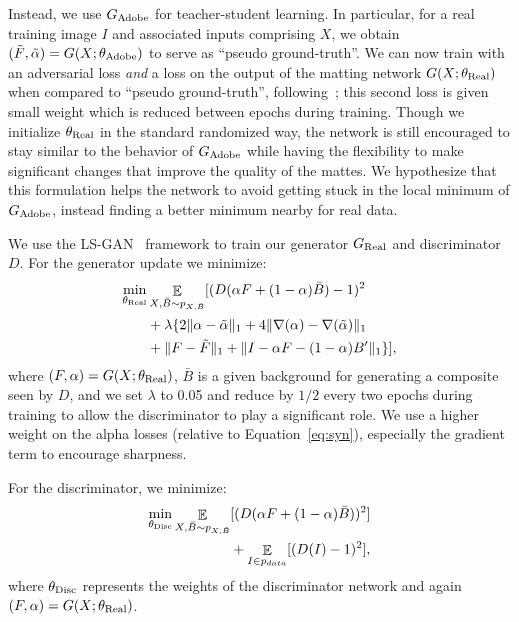 \documentclass[10pt,twocolumn,letterpaper]{article}
\DeclareMathOperator{\E}{\mathbb{E}}
\begin{document}
Instead, we use $G_{\rm Adobe}$ for teacher-student learning. In particular, for a real training image $I$ and associated inputs comprising $X$, we obtain $(\tilde{F}, \tilde{\alpha}) = G(X;\theta_{\rm Adobe})$ to serve as ``pseudo ground-truth''. We can now train with an adversarial loss {\it and} a loss on the output of the matting network $G(X;\theta_{\rm Real})$ when compared to ``pseudo ground-truth'', following~\cite{sfsnetSengupta18}; this second loss is given small weight which is reduced between epochs during training.  Though we initialize $\theta_{\rm Real}$ in the standard randomized way, the network is still encouraged to stay similar to the behavior of $G_{\rm Adobe}$ while having the flexibility to make significant changes that improve the quality of the mattes. We hypothesize that this formulation helps the network to avoid getting stuck in the local minimum of $G_{\rm Adobe}$, instead finding a better minimum nearby for real data. 

We use the LS-GAN~\cite{mao2017least} framework to train our generator $G_{\rm Real}$ and discriminator $D$. For the generator update we minimize:
\vspace{-1mm}
\begin{equation}
\label{eq:gen}
\begin{split}
\min_{\theta_{\rm Real}} 
&\E_{X,\bar{B} \sim p_{X,\bar{B}}} 
[(D(\alpha F + (1-\alpha) \bar{B})-1)^2 \\
&+\lambda \{2\|\alpha-\tilde{\alpha}\|_1 + 4 \|\nabla (\alpha)-\nabla (\tilde{\alpha})\|_1   \\
&+ \|F-\tilde{F}\|_1  + \| I - \alpha F - (1-\alpha) B'\|_1 \}],
\end{split}
\end{equation}
where $(F,\alpha) = G(X;\theta_{\rm Real})$, $\bar{B}$ is a given background for generating a composite seen by $D$, and we set $\lambda$ to 0.05 and reduce by $1/2$ every two epochs during training to allow the discriminator to play a significant role. We use a higher weight on the alpha losses (relative to Equation~\ref{eq:syn}), especially the gradient term to encourage sharpness. 

For the discriminator, we minimize:
\vspace{-1mm}
\begin{equation}
\label{eq:dis}
\begin{split}
\min_{\theta_{\rm Disc}} \E_{X,\bar{B} \sim p_{X,\bar{B}}} 
&[(D(\alpha F + (1-\alpha) \bar{B}))^2] \\ 
&+ \E_{I\in p_{data}} [(D(I)-1)^2],
\end{split}
\end{equation}
where $\theta_{\rm Disc}$ represents the weights of the discriminator network and again $(F,\alpha) = G(X;\theta_{\rm Real})$. 
\end{document}
